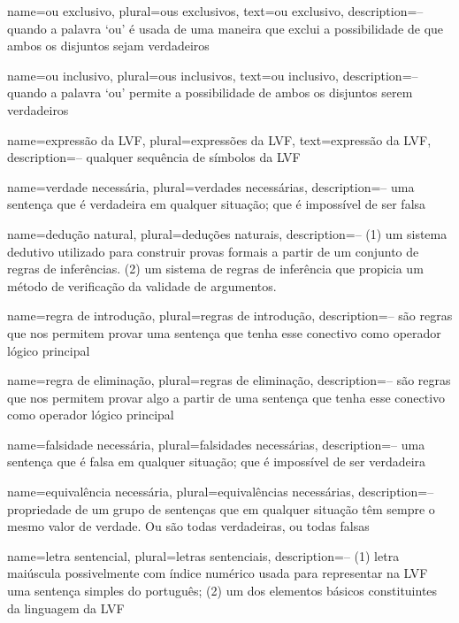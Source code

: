 {
 name=ou exclusivo,
 plural=ous exclusivos,
 text=ou exclusivo,
 description={-- quando a palavra `ou' é usada de uma maneira que exclui a
possibilidade de que ambos os disjuntos sejam verdadeiros}
}

{
 name=ou inclusivo,
 plural=ous inclusivos,
 text=ou inclusivo,
 description={-- quando a palavra `ou' permite a possibilidade de ambos os disjuntos
serem verdadeiros}
}

{
 name=expressão da LVF,
 plural=expressões da LVF,
 text=expressão da LVF,
 description={-- qualquer sequência de símbolos da LVF}
}

{
 name={verdade necessária},
 plural={verdades necessárias},
 description={-- uma sentença que é verdadeira em qualquer situação; que é impossível de ser falsa}
}

{
 name={dedução natural},
 plural={deduções naturais},
 description={-- (1) um sistema dedutivo utilizado para construir provas formais a partir de um conjunto de regras de inferências. (2) um sistema de regras de inferência que propicia um método de verificação da validade de argumentos.}
}

{
 name={regra de introdução},
 plural={regras de introdução},
 description={-- são regras que nos permitem provar uma sentença que tenha esse conectivo como operador lógico principal}
}

{
 name={regra de eliminação},
 plural={regras de eliminação},
 description={-- são regras que nos permitem provar algo a partir de uma
sentença que tenha esse conectivo como operador lógico principal}
}


{
 name={falsidade necessária},
 plural={falsidades necessárias},
 description={-- uma sentença que é falsa em qualquer situação; que é impossível de ser verdadeira}
}

{
 name={equivalência necessária},
 plural={equivalências necessárias},
 description={-- propriedade de um grupo de sentenças que em qualquer situação têm sempre o mesmo valor de verdade. Ou são todas verdadeiras, ou todas falsas}
}

{
 name=letra sentencial,
 plural=letras sentenciais,
 description={-- (1) letra maiúscula possivelmente com índice numérico usada para representar na LVF uma sentença simples do português; (2) um dos elementos básicos constituintes da linguagem da LVF}
}

